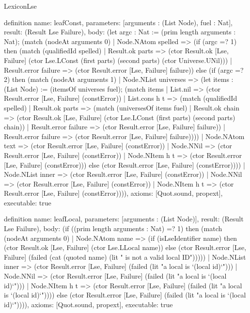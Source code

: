 \begin{lexlean}{LexiconLse}
\begin{semanticmodule}
definition{
  name: leafConst,
  parameters: [arguments : (List Node), fuel : Nat],
  result: (Result Lse Failure),
  body: (let argc : Nat := (prim length arguments : Nat); (match (nodeAt arguments 0)
    | Node.NAtom spelled => (if (argc =? 1) then (match (qualifiedId spelled)
      | Result.ok parts => (ctor Result.ok [Lse, Failure] (ctor Lse.LConst (first parts) (second parts) (ctor Universe.UNil)))
      | Result.error failure => (ctor Result.error [Lse, Failure] failure)) else (if (argc =? 2) then (match (nodeAt arguments 1)
      | Node.NList universes => (let items : (List Node) := (itemsOf universes fuel); (match items
        | List.nil => (ctor Result.error [Lse, Failure] (constError))
        | List.cons h t => (match (qualifiedId spelled)
          | Result.ok parts => (match (universesOf items fuel)
            | Result.ok chain => (ctor Result.ok [Lse, Failure] (ctor Lse.LConst (first parts) (second parts) chain))
            | Result.error failure => (ctor Result.error [Lse, Failure] failure))
          | Result.error failure => (ctor Result.error [Lse, Failure] failure))))
      | Node.NAtom text => (ctor Result.error [Lse, Failure] (constError))
      | Node.NNil => (ctor Result.error [Lse, Failure] (constError))
      | Node.NItem h t => (ctor Result.error [Lse, Failure] (constError))) else (ctor Result.error [Lse, Failure] (constError))))
    | Node.NList inner => (ctor Result.error [Lse, Failure] (constError))
    | Node.NNil => (ctor Result.error [Lse, Failure] (constError))
    | Node.NItem h t => (ctor Result.error [Lse, Failure] (constError)))),
  axioms: [Quot.sound, propext],
  executable: true
}

definition{
  name: leafLocal,
  parameters: [arguments : (List Node)],
  result: (Result Lse Failure),
  body: (if ((prim length arguments : Nat) =? 1) then (match (nodeAt arguments 0)
    | Node.NAtom name => (if (isLseIdentifier name) then (ctor Result.ok [Lse, Failure] (ctor Lse.LLocal name)) else (ctor Result.error [Lse, Failure] (failed (cat (quoted name) (lit " is not a valid local ID")))))
    | Node.NList inner => (ctor Result.error [Lse, Failure] (failed (lit "a local is `(local id)`")))
    | Node.NNil => (ctor Result.error [Lse, Failure] (failed (lit "a local is `(local id)`")))
    | Node.NItem h t => (ctor Result.error [Lse, Failure] (failed (lit "a local is `(local id)`")))) else (ctor Result.error [Lse, Failure] (failed (lit "a local is `(local id)`")))),
  axioms: [Quot.sound, propext],
  executable: true
}


\end{semanticmodule}
\end{lexlean}
